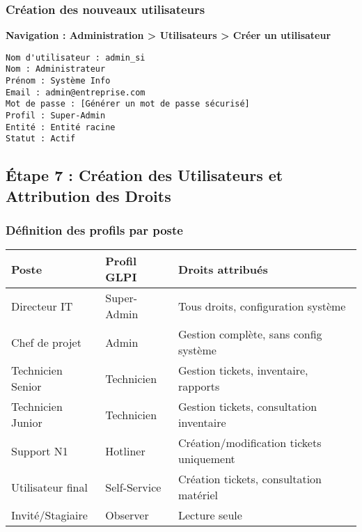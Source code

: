 \documentclass[12pt,a4paper]{article}
\begin{document}
\subsubsection{Création des nouveaux utilisateurs}
\textbf{Navigation : Administration > Utilisateurs > Créer un utilisateur}

\begin{lstlisting}[caption=Exemple de création d'utilisateur]
Nom d'utilisateur : admin_si
Nom : Administrateur
Prénom : Système Info
Email : admin@entreprise.com
Mot de passe : [Générer un mot de passe sécurisé]
Profil : Super-Admin
Entité : Entité racine
Statut : Actif
\end{lstlisting}

\subsection{Étape 7 : Création des Utilisateurs et Attribution des Droits}

\subsubsection{Définition des profils par poste}
\begin{center}
\begin{tabular}{|l|l|l|}
\hline
\textbf{Poste} & \textbf{Profil GLPI} & \textbf{Droits attribués} \\
\hline
Directeur IT & Super-Admin & Tous droits, configuration système \\
Chef de projet & Admin & Gestion complète, sans config système \\
Technicien Senior & Technicien & Gestion tickets, inventaire, rapports \\
Technicien Junior & Technicien & Gestion tickets, consultation inventaire \\
Support N1 & Hotliner & Création/modification tickets uniquement \\
Utilisateur final & Self-Service & Création tickets, consultation matériel \\
Invité/Stagiaire & Observer & Lecture seule \\
\hline
\end{tabular}
\end{center}
\end{document}
